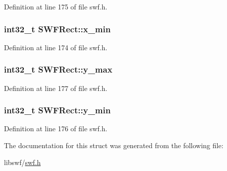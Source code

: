 Definition at line 175 of file swf.\+h.

\hypertarget{struct_s_w_f_rect_a8a6e16836789a2ad0f04a47571521da5}{}
\subsubsection[{x\+\_\+min}]{\setlength{\rightskip}{0pt plus 5cm}int32\+\_\+t S\+W\+F\+Rect\+::x\+\_\+min}\label{struct_s_w_f_rect_a8a6e16836789a2ad0f04a47571521da5}


Definition at line 174 of file swf.\+h.

\hypertarget{struct_s_w_f_rect_ad4030c2fb8cf190685abbb1db5b60d9c}{}
\subsubsection[{y\+\_\+max}]{\setlength{\rightskip}{0pt plus 5cm}int32\+\_\+t S\+W\+F\+Rect\+::y\+\_\+max}\label{struct_s_w_f_rect_ad4030c2fb8cf190685abbb1db5b60d9c}


Definition at line 177 of file swf.\+h.

\hypertarget{struct_s_w_f_rect_a02bf454cdaad92d3e78497f85dccda5d}{}
\subsubsection[{y\+\_\+min}]{\setlength{\rightskip}{0pt plus 5cm}int32\+\_\+t S\+W\+F\+Rect\+::y\+\_\+min}\label{struct_s_w_f_rect_a02bf454cdaad92d3e78497f85dccda5d}


Definition at line 176 of file swf.\+h.



The documentation for this struct was generated from the following file\+:\begin{DoxyCompactItemize}
\item 
libswf/\hyperlink{swf_8h}{swf.\+h}\end{DoxyCompactItemize}
